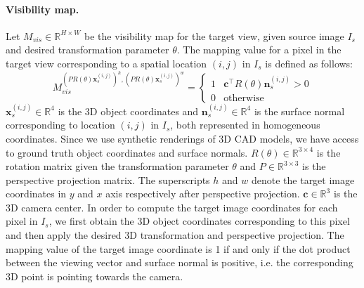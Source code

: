 \documentclass[10pt,twocolumn,letterpaper]{article}
\begin{document}
\vspace{-2mm}
\paragraph{Visibility map.}
Let $M_{vis} \in \mathbb{R}^{H \times W}$ be the visibility map for the target view, given source image $I_s$ and desired transformation parameter $\theta$. The mapping value for a pixel in the target view corresponding to a spatial location $(i,j)$ in $I_s$ is defined as follows: 
\begin{equation}
M_{vis}^{(PR(\theta)\mathbf{x}_s^{(i,j)})^h,(PR(\theta)\mathbf{x}_s^{(i,j)})^w} = \begin{cases} 
1 & \mathbf{c}^\top R(\theta)\mathbf{n}_s^{(i,j)} > 0\\
0 & \text{otherwise}
\end{cases}
\label{eq:dis}
\end{equation}
$\mathbf{x}_s^{(i,j)} \in \mathbb{R}^{4}$ is the 3D object coordinates and $\mathbf{n}_s^{(i,j)} \in \mathbb{R}^{4}$ is the surface normal corresponding to location $(i,j)$ in $I_s$, both represented in homogeneous coordinates. Since we use synthetic renderings of 3D CAD models, we have access to ground truth object coordinates and surface normals. $R(\theta) \in \mathbb{R}^{3 \times 4}$ is the rotation matrix given the transformation parameter $\theta$ and $P \in \mathbb{R}^{3 \times 3}$ is the perspective projection matrix. The superscripts $h$ and $w$ denote the target image coordinates in $y$ and $x$ axis respectively after perspective projection. $\mathbf{c} \in \mathbb{R}^{3}$ is the 3D camera center. In order to compute the target image coordinates for each pixel in $I_s$, we first obtain the 3D object coordinates corresponding to this pixel and then apply the desired 3D transformation and perspective projection. The mapping value of the target image coordinate is 1 if and only if the dot product between the viewing vector and surface normal is positive, i.e. the corresponding 3D point is pointing towards the camera.

\vspace{-2mm}
\end{document}
